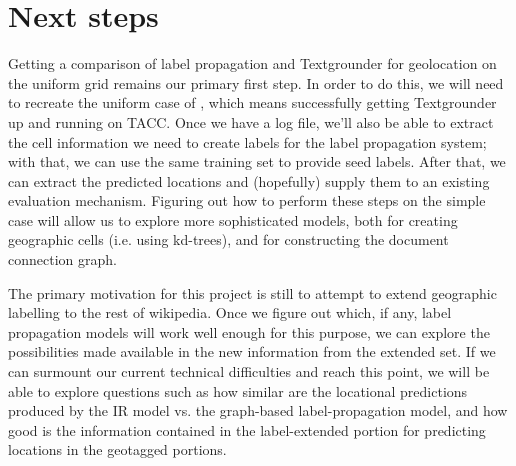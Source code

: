 \section{Next steps}
Getting a comparison of label propagation and Textgrounder for geolocation on
the uniform grid remains our primary first step.
In order to do this, we will need to recreate the uniform case of
\cite{rolleretal:12}, which means successfully getting Textgrounder up and
running on TACC.
Once we have a log file, we'll also be able to extract the cell information we
need to create labels for the label propagation system; with that, we can use
the same training set to provide seed labels.
After that, we can extract the predicted locations and (hopefully) supply them
to an existing evaluation mechanism.
Figuring out how to perform these steps on the simple case will allow us to
explore more sophisticated models, both for creating geographic cells (i.e.
using kd-trees), and for constructing the document connection graph.
\par
The primary motivation for this project is still to attempt to extend
geographic labelling to the rest of wikipedia. 
Once we figure out which, if any, label propagation models will work well
enough for this purpose, we can explore the possibilities made available in the
new information from the extended set.
If we can surmount our current technical difficulties and reach this point, we
will be able to explore questions such as how similar are the locational
predictions produced by the IR model vs. the graph-based label-propagation
model, and how good is the information contained in the label-extended portion for
predicting locations in the geotagged portions.

